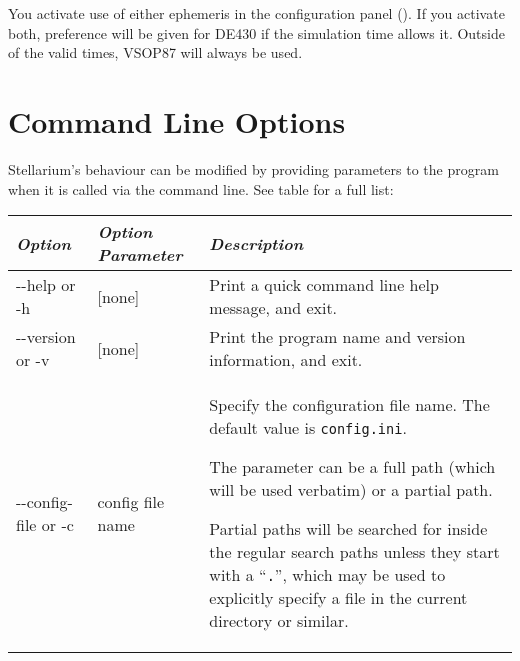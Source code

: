 You activate use of either ephemeris in the configuration panel
(). If you activate both, preference will be given for DE430
if the simulation time allows it. Outside of the valid times, VSOP87
will always be used.



\chapter{Command Line Options}
\label{command-line-options}
\label{sec:CommandLineOptions}

Stellarium's behaviour can be modified by providing parameters to the
program when it is called via the command line. See table for a full list:

\begin{longtabu} to \textwidth {l|l|X}
\toprule
\emph{Option} & \emph{Option Parameter} & \emph{Description}\tabularnewline
\midrule
-\/-help or -h & {[}none{]} & Print a quick command line help message, and exit. \tabularnewline
\midrule
-\/-version or -v & {[}none{]} & Print the program name and version information, and exit. \tabularnewline
\midrule
-\/-config-file or -c & config file name & Specify the configuration file name. The default value is \texttt{config.ini}.

The parameter can be a full path (which will be used verbatim) or a partial path.

Partial paths will be searched for inside the regular search paths
unless they start with a ``\texttt{.}'', which may be used to explicitly
specify a file in the current directory or similar.


\end{longtabu}
